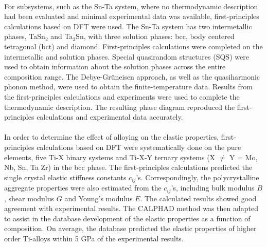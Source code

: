 \paragraph*{} For subsystems, such as the Sn-Ta system, where no thermodynamic description had been evaluated and minimal experimental data was available, first-principles calculations based on DFT were used. The Sn-Ta system has two intermetallic phases, TaSn$_{2}$ and Ta$_{3}$Sn, with three solution phases: bcc, body centered tetragonal (bct) and diamond. First-principles calculations were completed on the intermetallic and solution phases. Special quasirandom structures (SQS) were used to obtain information about the solution phases across the entire composition range. The Debye-Gr\"uneisen approach, as well as the quasiharmonic phonon method, were used to obtain the finite-temperature data. Results from the first-principles calculations and experiments were used to complete the thermodynamic description. The resulting phase diagram reproduced the first-principles calculations and experimental data accurately.
\paragraph*{} In order to determine the effect of alloying on the elastic properties, first-principles calculations based on DFT were systematically done on the pure elements, five Ti-X binary systems and Ti-X-Y ternary systems (X $\neq $ Y = Mo, Nb, Sn, Ta Zr) in the bcc phase. The first-principles calculations predicted the single crystal elastic stiffness constants $c_{ij}$'s. Correspondingly, the polycrystalline aggregate properties were also estimated from the $c_{ij}$'s, including bulk modulus $B$, shear modulus $G$ and Young's modulus $E$. The calculated results showed good agreement with experimental results. The CALPHAD method was then adapted to assist in the database development of the elastic properties as a function of composition. On average, the database predicted the elastic properties of higher order Ti-alloys within 5 GPa of the experimental results.
